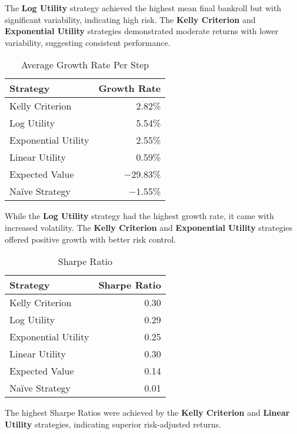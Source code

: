 The \textbf{Log Utility} strategy achieved the highest mean final bankroll but with significant variability, indicating high risk. The \textbf{Kelly Criterion} and \textbf{Exponential Utility} strategies demonstrated moderate returns with lower variability, suggesting consistent performance.

\begin{table}[H]
\centering
\caption{Average Growth Rate Per Step}
\label{tab:avg_growth}
\begin{tabular}{lr}
\toprule
\textbf{Strategy} & \textbf{Growth Rate} \\
\midrule
Kelly Criterion          & 2.82\% \\
Log Utility              & 5.54\% \\
Exponential Utility      & 2.55\% \\
Linear Utility           & 0.59\% \\
Expected Value           & $-$29.83\% \\
Naïve Strategy           & $-$1.55\% \\
\bottomrule
\end{tabular}
\end{table}

While the \textbf{Log Utility} strategy had the highest growth rate, it came with increased volatility. The \textbf{Kelly Criterion} and \textbf{Exponential Utility} strategies offered positive growth with better risk control.

\begin{table}[H]
\centering
\caption{Sharpe Ratio}
\label{tab:sharpe_ratio}
\begin{tabular}{lr}
\toprule
\textbf{Strategy} & \textbf{Sharpe Ratio} \\
\midrule
Kelly Criterion          & 0.30 \\
Log Utility              & 0.29 \\
Exponential Utility      & 0.25 \\
Linear Utility           & 0.30 \\
Expected Value           & 0.14 \\
Naïve Strategy           & 0.01 \\
\bottomrule
\end{tabular}
\end{table}

The highest Sharpe Ratios were achieved by the \textbf{Kelly Criterion} and \textbf{Linear Utility} strategies, indicating superior risk-adjusted returns.


